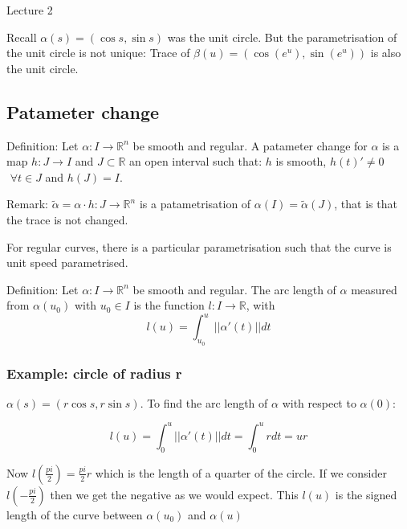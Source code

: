 \begin{center}

Lecture 2

\end{center}

Recall $\alpha (s) = (\cos s, \sin s)$ was the unit circle. But the parametrisation of the unit circle is not unique: Trace of $\beta (u) = (\cos (e^u), \sin (e^u))$ is also the unit circle.

\subsection{Patameter change}

Definition: Let $\alpha : I \rightarrow \mathbb{R}^n$ be smooth and regular. A patameter change for $\alpha$ is a map $h : J \rightarrow I$ and $J \subset \mathbb{R}$ an open interval such that: $h$ is smooth, $h(t)' \neq 0$ $\, \, \forall t \in J$ and $h(J) = I$.

\vspace{\baselineskip}

Remark: $\tilde{\alpha} = \alpha \cdot h : J \rightarrow \mathbb{R}^n$ is a patametrisation of $\alpha (I) = \tilde{\alpha} (J)$, that is that the trace is not changed.

\vspace{\baselineskip}

For regular curves, there is a particular parametrisation such that the curve is unit speed parametrised.

\vspace{\baselineskip}

Definition: Let $\alpha : I \rightarrow \mathbb{R}^n$ be smooth and regular. The arc length of $\alpha$ measured from $\alpha (u_0)$ with $u_0 \in I$ is the function $l : I \rightarrow \mathbb{R}$, with $$l (u) = \int_{u_0}^u || \alpha ' (t) || dt$$

\subsubsection*{Example: circle of radius r} 

$\alpha (s) = (r \cos s, r \sin s)$. To find the arc length of $\alpha$ with respect to $\alpha(0)$:

$$l(u) = \int_0^u || \alpha ' (t) || dt = \int_0^u r dt = ur$$

Now $l(\frac{pi}{2}) = \frac{pi}{2} r$ which is the length of a quarter of the circle. If we consider $l(-\frac{pi}{2})$ then we get the negative as we would expect. This $l(u)$ is the signed length of the curve between $\alpha(u_0)$ and $\alpha (u)$

